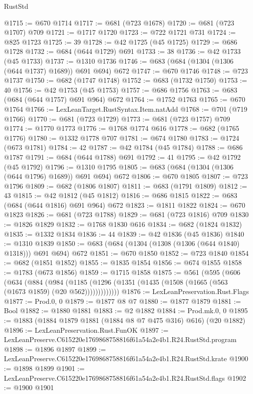 \begin{lexlean}{RustStd}
\begin{coremodule}
@1715 := @670 @1714
@1717 := @681 (@723 @1678)
@1720 := @681 (@723 @1707) @709
@1721 := @1717 @1720
@1723 := @722 @1721 @731
@1724 := @825 @1723
@1725 := 39
@1728 := @42 @1725 (@45 @1725)
@1729 := @686 @1728
@1732 := @684 (@644 @1729) @691
@1733 := 38
@1736 := @42 @1733 (@45 @1733)
@1737 := @1310 @1736
@1746 := @683 (@684 (@1304 (@1306 (@644 @1737) @1689)) @691 @694) @672
@1747 := @670 @1746
@1748 := @723 @1737
@1750 := @682 (@1747 @1748)
@1752 := @683 (@1732 @1750)
@1753 := 40
@1756 := @42 @1753 (@45 @1753)
@1757 := @686 @1756
@1763 := @683 (@684 (@644 @1757) @691 @964) @672
@1764 := @1752 @1763
@1765 := @670 @1764
@1766 := LexLeanTarget.RustSyntax.Item.natAdd
@1768 := @701 (@719 @1766)
@1770 := @681 (@723 @1729)
@1773 := @681 (@723 @1757) @709
@1774 := @1770 @1773
@1776 := @1768 @1774 @616
@1778 := @682 (@1765 @1776)
@1780 := @1332 @1778 @707
@1781 := @674 @1780
@1783 := @1724 (@673 @1781)
@1784 := 42
@1787 := @42 @1784 (@45 @1784)
@1788 := @686 @1787
@1791 := @684 (@644 @1788) @691
@1792 := 41
@1795 := @42 @1792 (@45 @1792)
@1796 := @1310 @1795
@1805 := @683 (@684 (@1304 (@1306 (@644 @1796) @1689)) @691 @694) @672
@1806 := @670 @1805
@1807 := @723 @1796
@1809 := @682 (@1806 @1807)
@1811 := @683 (@1791 @1809)
@1812 := 43
@1815 := @42 @1812 (@45 @1812)
@1816 := @686 @1815
@1822 := @683 (@684 (@644 @1816) @691 @964) @672
@1823 := @1811 @1822
@1824 := @670 @1823
@1826 := @681 (@723 @1788)
@1829 := @681 (@723 @1816) @709
@1830 := @1826 @1829
@1832 := @1768 @1830 @616
@1834 := @682 (@1824 @1832)
@1835 := @1332 @1834
@1836 := 44
@1839 := @42 @1836 (@45 @1836)
@1840 := @1310 @1839
@1850 := @683 (@684 (@1304 (@1308 (@1306 (@644 @1840) @1318))) @691 @694) @672
@1851 := @670 @1850
@1852 := @723 @1840
@1854 := @682 (@1851 @1852)
@1855 := @1835 @1854
@1856 := @674 @1855
@1858 := @1783 (@673 @1856)
@1859 := @1715 @1858
@1875 := @561
    (@595
      (@606
        (@634
          (@884
            (@984
              (@1185 (@1296 (@1351 (@1435 (@1508 (@1665 (@563 (@1673 @1859) (@20 @562)))))))))))))
@1876 := LexLeanPreservation.Rust.Flags
@1877 := Prod.{0, 0}
@1879 := @1877 @8 @7
@1880 := @1877 @1879
@1881 := Bool
@1882 := @1880 @1881
@1883 := @2 @1882
@1884 := Prod.mk.{0, 0}
@1895 := @1883 (@1884 @1879 @1881 (@1884 @8 @7 @475 @316) @616) (@20 @1882)
@1896 := LexLeanPreservation.Rust.FunOK
@1897 := LexLeanPreserve.C615220e1769868758816f61a54a2e4b1.R24.RustStd.program
@1898 := @1896 @1897
@1899 := LexLeanPreserve.C615220e1769868758816f61a54a2e4b1.R24.RustStd.krate
@1900 := @1898 @1899
@1901 := LexLeanPreserve.C615220e1769868758816f61a54a2e4b1.R24.RustStd.flags
@1902 := @1900 @1901

\end{coremodule}
\end{lexlean}
